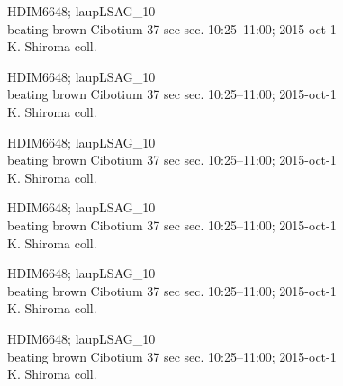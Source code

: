 \documentclass[2pt]{extarticle}
\begin{document}
\noindent
\parbox{0.16\textwidth}{\tiny \raggedright \rule[-0.3\baselineskip]{0pt}{10pt}HDIM6648; laupLSAG\_10\\ beating brown Cibotium 37 sec sec. 10:25--11:00; 2015-oct-1\\ K. Shiroma coll.}
\parbox{0.16\textwidth}{\tiny \raggedright \rule[-0.3\baselineskip]{0pt}{10pt}HDIM6648; laupLSAG\_10\\ beating brown Cibotium 37 sec sec. 10:25--11:00; 2015-oct-1\\ K. Shiroma coll.}
\parbox{0.16\textwidth}{\tiny \raggedright \rule[-0.3\baselineskip]{0pt}{10pt}HDIM6648; laupLSAG\_10\\ beating brown Cibotium 37 sec sec. 10:25--11:00; 2015-oct-1\\ K. Shiroma coll.}
\parbox{0.16\textwidth}{\tiny \raggedright \rule[-0.3\baselineskip]{0pt}{10pt}HDIM6648; laupLSAG\_10\\ beating brown Cibotium 37 sec sec. 10:25--11:00; 2015-oct-1\\ K. Shiroma coll.}
\parbox{0.16\textwidth}{\tiny \raggedright \rule[-0.3\baselineskip]{0pt}{10pt}HDIM6648; laupLSAG\_10\\ beating brown Cibotium 37 sec sec. 10:25--11:00; 2015-oct-1\\ K. Shiroma coll.}
\parbox{0.16\textwidth}{\tiny \raggedright \rule[-0.3\baselineskip]{0pt}{10pt}HDIM6648; laupLSAG\_10\\ beating brown Cibotium 37 sec sec. 10:25--11:00; 2015-oct-1\\ K. Shiroma coll.} \\ 
\vspace{0.001in} 
\end{document}

